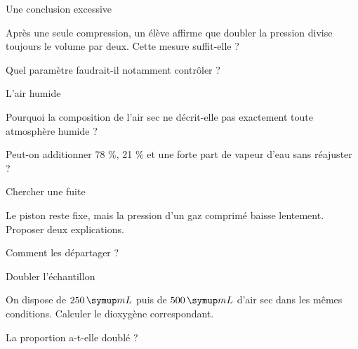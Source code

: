 \clearpage{}
\par\noindent\begin{minipage}{\linewidth}
\begin{exercice}[3]{Une conclusion excessive}
\begin{questions}
\item Après une seule compression, un élève affirme que doubler la pression divise toujours le volume par deux. Cette mesure suffit-elle ?
\item Quel paramètre faudrait-il notamment contrôler ?
\end{questions}
\end{exercice}
\end{minipage}
\par\noindent\begin{minipage}{\linewidth}
\begin{exercice}[3]{L’air humide}
\begin{questions}
\item Pourquoi la composition de l’air sec ne décrit-elle pas exactement toute atmosphère humide ?
\item Peut-on additionner 78 \%, 21 \% et une forte part de vapeur d’eau sans réajuster ?
\end{questions}
\end{exercice}
\end{minipage}
\par\noindent\begin{minipage}{\linewidth}
\begin{exercice}[3]{Chercher une fuite}
\begin{questions}
\item Le piston reste fixe, mais la pression d’un gaz comprimé baisse lentement. Proposer deux explications.
\item Comment les départager ?
\end{questions}
\end{exercice}
\end{minipage}
\par\noindent\begin{minipage}{\linewidth}
\begin{exercice}[3]{Doubler l’échantillon}
\begin{questions}
\item On dispose de $250\unite{mL}$ puis de $500\unite{mL}$ d’air sec dans les mêmes conditions. Calculer le dioxygène correspondant.
\item La proportion a-t-elle doublé ?
\end{questions}
\end{exercice}
\end{minipage}
